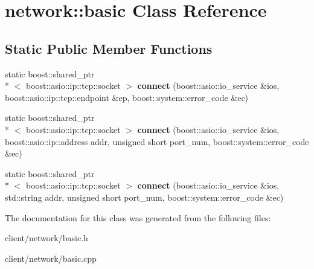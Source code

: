 \hypertarget{classnetwork_1_1basic}{\section{network\-:\-:basic Class Reference}
\label{classnetwork_1_1basic}
}
\subsection*{Static Public Member Functions}
\begin{DoxyCompactItemize}
\item 
\hypertarget{classnetwork_1_1basic_a130835af9a165fd1dd6af3d7d76b87e0}{static boost\-::shared\-\_\-ptr\\*
$<$ boost\-::asio\-::ip\-::tcp\-::socket $>$ {\bfseries connect} (boost\-::asio\-::io\-\_\-service \&ios, boost\-::asio\-::ip\-::tcp\-::endpoint \&ep, boost\-::system\-::error\-\_\-code \&ec)}\label{classnetwork_1_1basic_a130835af9a165fd1dd6af3d7d76b87e0}

\item 
\hypertarget{classnetwork_1_1basic_a5054c7f4d572723ab7c7ad58c2073786}{static boost\-::shared\-\_\-ptr\\*
$<$ boost\-::asio\-::ip\-::tcp\-::socket $>$ {\bfseries connect} (boost\-::asio\-::io\-\_\-service \&ios, boost\-::asio\-::ip\-::address addr, unsigned short port\-\_\-num, boost\-::system\-::error\-\_\-code \&ec)}\label{classnetwork_1_1basic_a5054c7f4d572723ab7c7ad58c2073786}

\item 
\hypertarget{classnetwork_1_1basic_acb3f93308a89639e0cb9358d1584b89b}{static boost\-::shared\-\_\-ptr\\*
$<$ boost\-::asio\-::ip\-::tcp\-::socket $>$ {\bfseries connect} (boost\-::asio\-::io\-\_\-service \&ios, std\-::string addr, unsigned short port\-\_\-num, boost\-::system\-::error\-\_\-code \&ec)}\label{classnetwork_1_1basic_acb3f93308a89639e0cb9358d1584b89b}

\end{DoxyCompactItemize}


The documentation for this class was generated from the following files\-:\begin{DoxyCompactItemize}
\item 
client/network/basic.\-h\item 
client/network/basic.\-cpp\end{DoxyCompactItemize}
